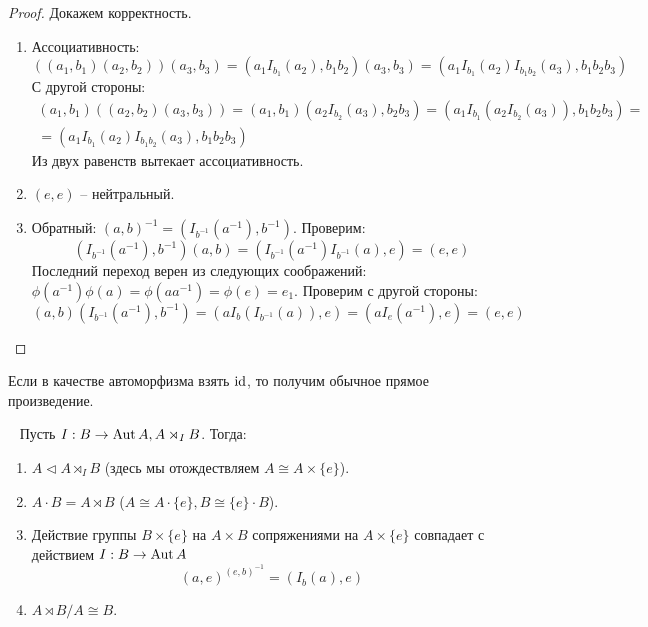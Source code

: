 \begin{proof}
    Докажем корректность.
    \begin{enumerate}
        \item Ассоциативность: 
        $$((a_1, b_1)(a_2, b_2))(a_3, b_3) = (a_1 I_{b_1}(a_2), b_1b_2)(a_3, b_3) = (a_1I_{b_1}(a_2)I_{b_1b_2}(a_3), b_1b_2b_3)$$
        С другой стороны: 
        \begin{equation}
            \begin{gathered}
                (a_1, b_1)((a_2, b_2)(a_3, b_3)) = (a_1, b_1)(a_2I_{b_2}(a_3), b_2b_3) = (a_1I_{b_1}(a_2I_{b_2}(a_3)), b_1b_2b_3) = \\
                = (a_1I_{b_1}(a_2)I_{b_1b_2}(a_3), b_1b_2b_3)
            \end{gathered}
        \end{equation}
        Из двух равенств вытекает ассоциативность.
        \item $(e, e)$ -- нейтральный.
        \item Обратный: 
        $(a, b)^{-1} = (I_{b^{-1}}(a^{-1}), b^{-1})$. Проверим: $$(I_{b^{-1}}(a^{-1}), b^{-1})(a, b) = (I_{b^{-1}}(a^{-1}) I_{b^{-1}}(a), e) = (e, e)$$
        Последний переход верен из следующих соображений: $\phi(a^{-1}) \phi(a) = \phi(a a^{-1}) = \phi(e) = e_1$. Проверим с другой стороны: $$(a, b)(I_{b^{-1}}(a^{-1}), b^{-1}) = (a I_b(I_{b^{-1}}(a)), e) = (a I_e(a^{-1}), e) = (e, e)$$
    \end{enumerate}
\end{proof}

\begin{note}
    Если в качестве автоморфизма взять $\mathrm{id}$, то получим обычное прямое произведение.
\end{note}

\begin{theorem}~
    Пусть $I: B \to \operatorname{Aut} A, A \rtimes_I B$. Тогда:
    \begin{enumerate}
        \item $A \lhd A \rtimes_I B$ (здесь мы отождествляем $A \cong A \times \{ e \}$).
        \item $A \cdot B = A \rtimes B$ ($A \cong A \cdot \{ e \}, B \cong \{ e \} \cdot B$).
        \item Действие группы $B \times \{ e \}$ на $A \times B$ сопряжениями на $A \times \{ e \}$ совпадает с действием $I: B \to \operatorname{Aut} A$
        $$(a, e)^{(e, b)^{-1}} = (I_b(a), e)$$
        \item $A \rtimes B/A \cong B$.
    \end{enumerate}
\end{theorem}

